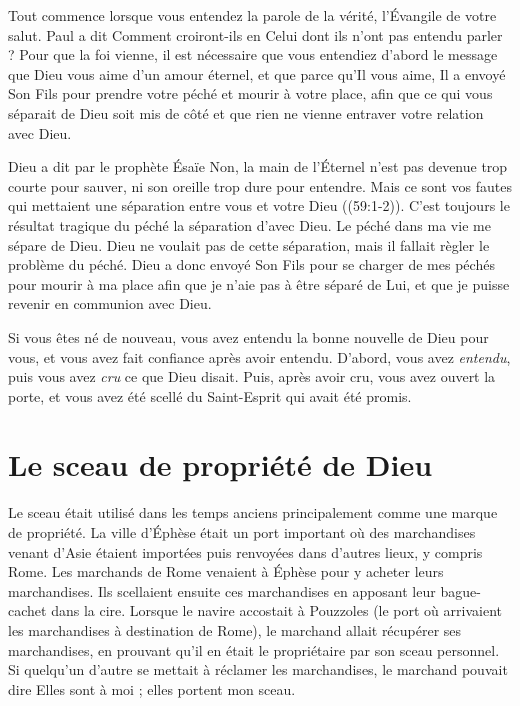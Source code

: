 Tout commence lorsque vous entendez \Og la parole de la vérité,
 l'Évangile de votre salut. \Fg{} Paul a dit\frcolon{}
 \Og Comment croiront-ils en Celui dont ils n'ont pas entendu parler ? \Fg{}
 Pour que la foi vienne, il est nécessaire que vous entendiez d'abord le message
 que Dieu vous aime d'un amour éternel, et que parce qu'Il vous aime,
 Il a envoyé Son Fils pour prendre votre péché et mourir à votre place,
 afin que ce qui vous séparait de Dieu soit mis de côté et que rien
 ne vienne entraver votre relation avec Dieu.

Dieu a dit par le prophète Ésaïe\frcolon{}
 \Og Non, la main de l'Éternel n'est pas devenue trop courte pour sauver,
 ni son oreille trop dure pour entendre. Mais ce sont vos fautes qui mettaient
 une séparation entre vous et votre Dieu \Fg{} ((59:1-2)).
 C'est toujours le résultat tragique du péché\frcolon{} la séparation d'avec Dieu.
 Le péché dans ma vie me sépare de Dieu.
 Dieu ne voulait pas de cette séparation, mais il fallait règler le problème du péché.
 Dieu a donc envoyé Son Fils pour se charger de mes péchés
 \ocadr pour mourir à ma place \ocadr afin que je n'aie pas
 à être séparé de Lui, et que je puisse revenir
 en communion avec Dieu.

Si vous êtes né de nouveau, vous avez entendu
 la bonne nouvelle de Dieu pour vous, et vous avez fait confiance
 après avoir entendu. D'abord, vous avez \emph{entendu},
 puis vous avez \emph{cru} ce que Dieu disait.
 Puis, après avoir cru, vous avez ouvert la porte,
 et vous avez été \Og scellé du Saint-Esprit qui avait été promis. \Fg{}


\section{Le sceau de propri\'et\'e de Dieu}

\begin{specialpar}{}
Le sceau était utilisé dans les temps anciens principalement
 comme une marque de propriété.
 La ville d'Éphèse était un port important où des marchandises
 venant d'Asie étaient importées puis renvoyées dans d'autres lieux,
 y compris Rome.
 Les marchands de Rome venaient à Éphèse pour y acheter leurs marchandises.
 Ils scellaient ensuite ces marchandises en apposant leur bague-cachet
 dans la cire.
 Lorsque le navire accostait à Pouzzoles
 (le port où arrivaient les marchandises à destination de Rome),
 le marchand allait récupérer ses marchandises,
 en prouvant qu'il en était le propriétaire par son sceau personnel.
 Si quelqu'un d'autre se mettait à réclamer les marchandises,
 le marchand pouvait dire\frcolon{}
 \Og Elles sont à moi ; elles portent mon sceau. \Fg{}
\end{specialpar}

